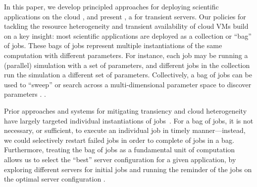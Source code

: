 In this paper, we develop principled approaches for deploying   scientific  applications on the cloud , and present \sysname, a  for   transient  servers. 
%
%
Our policies for tackling the resource heterogeneity and transient availability of cloud VMs build on a key insight: most scientific  applications are deployed as a collection or ``bag'' of jobs. 
%
These bags of jobs represent multiple instantiations of the same computation with different parameters. 
%
For instance, each job may be running a (parallel) simulation with a set of  parameters, and different jobs in the collection run the  simulation  a different set of  parameters. 
Collectively, a bag of jobs can be used to ``sweep'' or search across a multi-dimensional parameter space to discover  parameters . .

Prior approaches and systems for mitigating transiency and cloud heterogeneity have largely targeted individual instantiations of jobs~\cite{spoton, exosphere, flint, marathe2014exploiting}. 
%
For a bag of jobs, it is not necessary, or sufficient, to execute an individual job in timely manner---instead, we could selectively restart failed jobs in order to complete  of jobs in a bag. 
%
Furthermore, treating the bag of jobs as a fundamental unit of computation allows us to select the ``best'' server configuration for a given application, by exploring different servers for initial jobs and running the reminder of the jobs on the optimal server configuration . 


